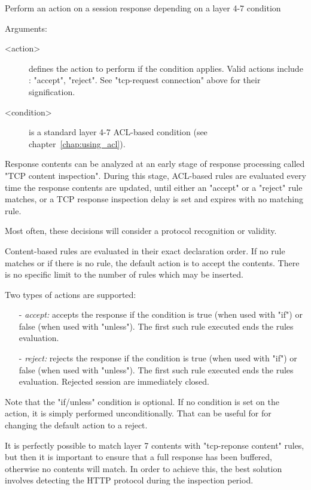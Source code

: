 {  Perform an action on a session response depending on a layer 4-7 condition


  Arguments:
  \begin{description}
  \item[<action>] defines the action to perform if the condition applies. Valid
                actions include : "accept", "reject".
                See "tcp-request connection" above for their signification.

  \item[<condition>] is a standard layer 4-7 ACL-based condition (see chapter~\ref{chap:using_acl}).
  \end{description}

  Response contents can be analyzed at an early stage of response processing
  called "TCP content inspection". During this stage, ACL-based rules are
  evaluated every time the response contents are updated, until either an
  "accept" or a "reject" rule matches, or a TCP response inspection delay is
  set and expires with no matching rule.

  Most often, these decisions will consider a protocol recognition or validity.

  Content-based rules are evaluated in their exact declaration order. If no
  rule matches or if there is no rule, the default action is to accept the
  contents. There is no specific limit to the number of rules which may be
  inserted.

  Two types of actions are supported:
  \begin{itemize}
  \item[-] \emph{accept:}
        accepts the response if the condition is true (when used with "if")
        or false (when used with "unless"). The first such rule executed ends
        the rules evaluation.

  \item[-] \emph{reject:}
        rejects the response if the condition is true (when used with "if")
        or false (when used with "unless"). The first such rule executed ends
        the rules evaluation. Rejected session are immediately closed.
  \end{itemize}

  Note that the "if/unless" condition is optional. If no condition is set on
  the action, it is simply performed unconditionally. That can be useful for
  for changing the default action to a reject.

  It is perfectly possible to match layer 7 contents with "tcp-reponse content"
  rules, but then it is important to ensure that a full response has been
  buffered, otherwise no contents will match. In order to achieve this, the
  best solution involves detecting the HTTP protocol during the inspection
  period.

}
